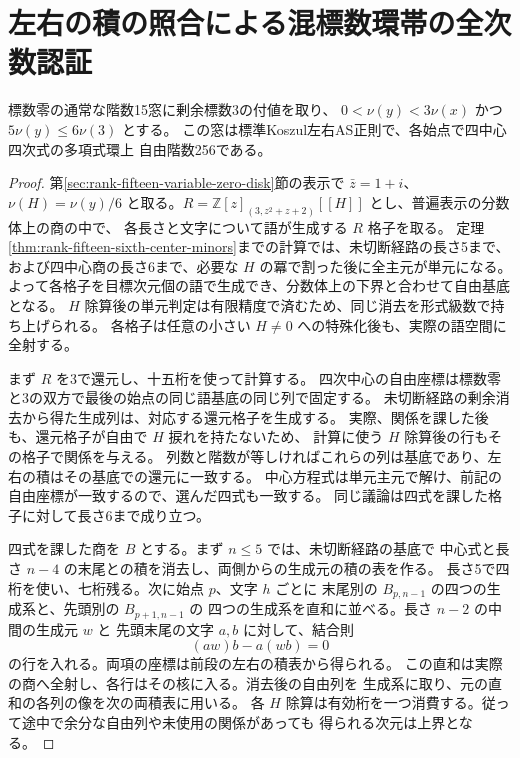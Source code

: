 \section{左右の積の照合による混標数環帯の全次数認証}
\label{sec:rank-fifteen-overlap-annulus}
\begin{theorem}\label{thm:rank-fifteen-overlap-annulus}
標数零の通常な階数15窓に剰余標数3の付値を取り、
$0<\nu(y)<3\nu(x)$ かつ $5\nu(y)\le6\nu(3)$ とする。
この窓は標準Koszul左右AS正則で、各始点で四中心四次式の多項式環上
自由階数256である。
\end{theorem}
\begin{proof}
第\ref{sec:rank-fifteen-variable-zero-disk}節の表示で $\bar z=1+i$、
$\nu(H)=\nu(y)/6$ と取る。$R=\mathbb Z[z]_{(3,z^2+z+2)}[[H]]$ とし、普遍表示の分数体上の商の中で、
各長さと文字について語が生成する $R$ 格子を取る。
定理\ref{thm:rank-fifteen-sixth-center-minors}までの計算では、未切断経路の長さ5まで、
および四中心商の長さ6まで、必要な $H$ の冪で割った後に全主元が単元になる。
よって各格子を目標次元個の語で生成でき、分数体上の下界と合わせて自由基底となる。
$H$ 除算後の単元判定は有限精度で済むため、同じ消去を形式級数で持ち上げられる。
各格子は任意の小さい $H\ne0$ への特殊化後も、実際の語空間に全射する。

まず $R$ を3で還元し、十五桁を使って計算する。
四次中心の自由座標は標数零と3の双方で最後の始点の同じ語基底の同じ列で固定する。
未切断経路の剰余消去から得た生成列は、対応する還元格子を生成する。
実際、関係を課した後も、還元格子が自由で $H$ 捩れを持たないため、
計算に使う $H$ 除算後の行もその格子で関係を与える。
列数と階数が等しければこれらの列は基底であり、左右の積はその基底での還元に一致する。
中心方程式は単元主元で解け、前記の自由座標が一致するので、選んだ四式も一致する。
同じ議論は四式を課した格子に対して長さ6まで成り立つ。

四式を課した商を $B$ とする。まず $n\le5$ では、未切断経路の基底で
中心式と長さ $n-4$ の末尾との積を消去し、両側からの生成元の積の表を作る。
長さ5で四桁を使い、七桁残る。次に始点 $p$、文字 $h$ ごとに
末尾別の $B_{p,n-1}$ の四つの生成系と、先頭別の $B_{p+1,n-1}$ の
四つの生成系を直和に並べる。長さ $n-2$ の中間の生成元 $w$ と
先頭末尾の文字 $a,b$ に対して、結合則
\[
                       (aw)b-a(wb)=0
\]
の行を入れる。両項の座標は前段の左右の積表から得られる。
この直和は実際の商へ全射し、各行はその核に入る。消去後の自由列を
生成系に取り、元の直和の各列の像を次の両積表に用いる。
各 $H$ 除算は有効桁を一つ消費する。従って途中で余分な自由列や未使用の関係があっても
得られる次元は上界となる。


\end{proof}
